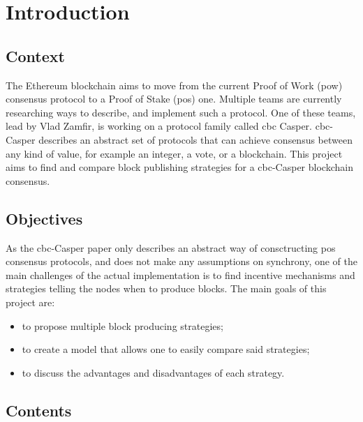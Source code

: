 \chapter{Introduction}
\label{chap:introduction}

\section{Context}

The Ethereum blockchain aims to move from the current Proof of Work (\gls{pow})
consensus protocol to a Proof of Stake (\gls{pos}) one. Multiple teams are
currently researching ways to describe, and implement such a protocol. One of
these teams, lead by Vlad Zamfir, is working on a protocol family called
\gls{cbc} Casper.  \gls{cbc}-Casper describes an abstract set of protocols that
can achieve consensus between any kind of value, for example an integer, a vote,
or a blockchain. This project aims to find and compare block publishing
strategies for a \gls{cbc}-Casper blockchain consensus.

\section{Objectives}
As the \gls{cbc}-Casper paper only describes an abstract way of consctructing
\gls{pos} consensus protocols, and does not make any assumptions on synchrony,
one of the main challenges of the actual implementation is to find incentive
mechanisms and strategies telling the nodes when to produce blocks.  The main
goals of this project are:

\begin{itemize}
        \item to propose multiple block producing strategies;
        \item to create a model that allows one to easily compare said strategies;
        \item to discuss the advantages and disadvantages of each strategy.
\end{itemize}

\section{Contents}



